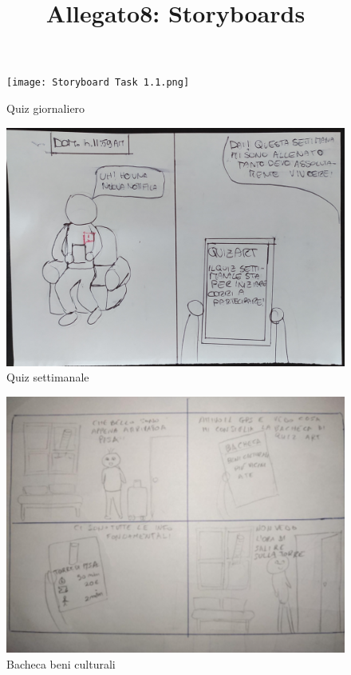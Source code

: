 \documentclass{article}
\title{\textbf{Allegato8: Storyboards}}
\date{}
\begin{document}
\maketitle

\begin{figure}[htp]
\begin{center}
\texttt{[image: Storyboard Task 1.1.png]}
\caption{Quiz giornaliero}
\end{center}
\end{figure} 


\begin{figure}[htp]
\begin{center}
\includegraphics[width=1 \textwidth]{Storyboard Task 1.2.png}
\caption{Quiz settimanale}
\end{center}
\end{figure} 


\begin{figure}[htp]
\begin{center}
\includegraphics[width=1 \textwidth]{Storyboard Task 2.png}
\caption{Bacheca beni culturali}
\end{center}
\end{figure} 
\end{document}

